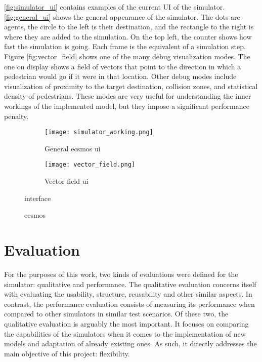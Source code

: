\documentclass[twoside, 11pt]{article}
\begin{document}
\autoref{fig:simulator_ui} contains examples of the current UI of the simulator. \autoref{fig:general_ui} shows the general appearance of the simulator. The dots are agents, the circle to the left is their destination, and the rectangle to the right is where they are added to the simulation. On the top left, the counter shows how fast the simulation is going. Each frame is the equivalent of a simulation step. Figure \autoref{fig:vector_field} shows one of the many debug visualization modes. The one on display shows a field of vectors that point to the direction in which a pedestrian would go if it were in that location. Other debug modes include visualization of proximity to the target destination, collision zones, and statistical density of pedestrians. These modes are very useful for understanding the inner workings of the implemented model, but they impose a significant performance penalty.

\begin{figure}[h]
  \centering
  \begin{subfigure}{.5\textwidth}
    \centering
    \texttt{[image: simulator\_working.png]}
    \caption{General \gls{ecsmos} \gls{ui}}
    \label{fig:general_ui}
  \end{subfigure}%
  \begin{subfigure}{.5\textwidth}
    \centering
    \texttt{[image: vector\_field.png]}
    \caption{Vector field \gls{ui}}
    \label{fig:vector_field}
  \end{subfigure}%
  \caption{\gls{ecsmos}} interface
  \label{fig:simulator_ui}
\end{figure}

\section{Evaluation} \label{sec:evaluation}

For the purposes of this work, two kinds of evaluations were defined for the simulator: qualitative and performance. The qualitative evaluation concerns itself with evaluating the usability, structure, reusability and other similar aspects. In contrast, the performance evaluation consists of measuring its performance when compared to other simulators in similar test scenarios.  Of these two, the qualitative evaluation is arguably the most important. It focuses on comparing the capabilities of the simulators when it comes to the implementation of new models and adaptation of already existing ones. As such, it directly addresses the main objective of this project: flexibility. 
\end{document}

